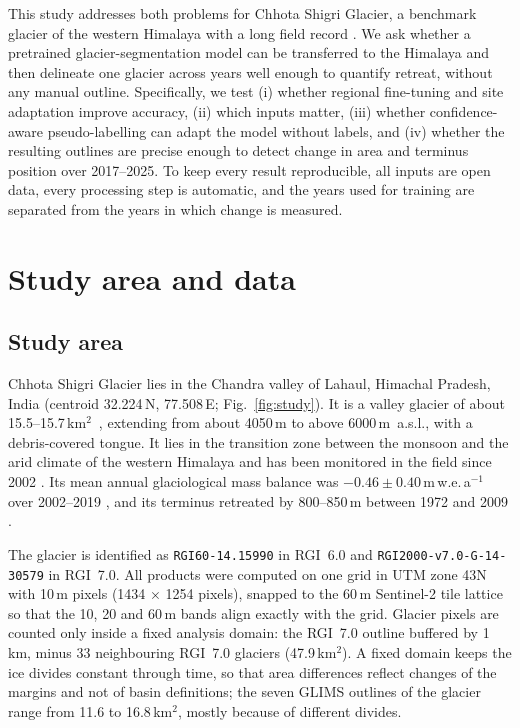 \documentclass[pdflatex,sn-mathphys-num]{sn-jnl}%
\theoremstyle{thmstyleone}%
\theoremstyle{thmstyletwo}%
\theoremstyle{thmstylethree}%
\newcommand{\kmsq}{km$^2$}
\begin{document}
This study addresses both problems for Chhota Shigri Glacier, a benchmark glacier of the western Himalaya with a long field record \cite{wagnon2007,azam2016,mandal2020}. We ask whether a pretrained glacier-segmentation model can be transferred to the Himalaya and then delineate one glacier across years well enough to quantify retreat, without any manual outline. Specifically, we test (i) whether regional fine-tuning and site adaptation improve accuracy, (ii) which inputs matter, (iii) whether confidence-aware pseudo-labelling \cite{lee2013,xie2020noisy} can adapt the model without labels, and (iv) whether the resulting outlines are precise enough to detect change in area and terminus position over 2017--2025. To keep every result reproducible, all inputs are open data, every processing step is automatic, and the years used for training are separated from the years in which change is measured.

\section{Study area and data}\label{sec2}

\subsection{Study area}\label{subsec2.1}

Chhota Shigri Glacier lies in the Chandra valley of Lahaul, Himachal Pradesh, India (centroid 32.224\textdegree\,N, 77.508\textdegree\,E; Fig.~\ref{fig:study}). It is a valley glacier of about 15.5--15.7\,\kmsq\ \cite{wagnon2007,mandal2020}, extending from about 4050\,m to above 6000\,m~a.s.l., with a debris-covered tongue. It lies in the transition zone between the monsoon and the arid climate of the western Himalaya and has been monitored in the field since 2002 \cite{wagnon2007,azam2016}. Its mean annual glaciological mass balance was $-0.46 \pm 0.40$\,m\,w.e.\,a$^{-1}$ over 2002--2019 \cite{mandal2020}, and its terminus retreated by 800--850\,m between 1972 and 2009 \cite{gantayat2017}.

The glacier is identified as \texttt{RGI60-14.15990} in RGI~6.0 and \texttt{RGI2000-v7.0-G-14-30579} in RGI~7.0. All products were computed on one grid in UTM zone 43N with 10\,m pixels (1434 $\times$ 1254 pixels), snapped to the 60\,m Sentinel-2 tile lattice so that the 10, 20 and 60\,m bands align exactly with the grid. Glacier pixels are counted only inside a fixed analysis domain: the RGI~7.0 outline buffered by 1\,km, minus 33 neighbouring RGI~7.0 glaciers (47.9\,\kmsq). A fixed domain keeps the ice divides constant through time, so that area differences reflect changes of the margins and not of basin definitions; the seven GLIMS outlines of the glacier range from 11.6 to 16.8\,\kmsq, mostly because of different divides.
\end{document}
